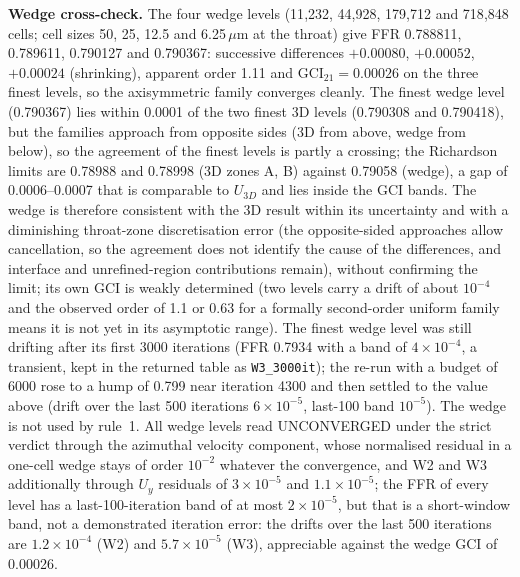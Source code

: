 \documentclass[11pt]{article}
\begin{document}
\textbf{Wedge cross-check.} The four wedge levels (11{,}232, 44{,}928, 179{,}712 and 718{,}848 cells; cell sizes 50, 25, 12.5 and 6.25\,$\mu$m at the throat) give FFR 0.788811, 0.789611, 0.790127 and 0.790367: successive differences $+0.00080$, $+0.00052$, $+0.00024$ (shrinking), apparent order 1.11 and GCI$_{21}=0.00026$ on the three finest levels, so the axisymmetric family converges cleanly. The finest wedge level (0.790367) lies within 0.0001 of the two finest 3D levels (0.790308 and 0.790418), but the families approach from opposite sides (3D from above, wedge from below), so the agreement of the finest levels is partly a crossing; the Richardson limits are 0.78988 and 0.78998 (3D zones A, B) against 0.79058 (wedge), a gap of 0.0006--0.0007 that is comparable to $U_{3D}$ and lies inside the GCI bands. The wedge is therefore consistent with the 3D result within its uncertainty and with a diminishing throat-zone discretisation error (the opposite-sided approaches allow cancellation, so the agreement does not identify the cause of the differences, and interface and unrefined-region contributions remain), without confirming the limit; its own GCI is weakly determined (two levels carry a drift of about $10^{-4}$ and the observed order of 1.1 or 0.63 for a formally second-order uniform family means it is not yet in its asymptotic range). The finest wedge level was still drifting after its first 3000 iterations (FFR 0.7934 with a band of $4\times10^{-4}$, a transient, kept in the returned table as \texttt{W3\_3000it}); the re-run with a budget of 6000 rose to a hump of 0.799 near iteration 4300 and then settled to the value above (drift over the last 500 iterations $6\times10^{-5}$, last-100 band $10^{-5}$). The wedge is not used by rule~1. All wedge levels read UNCONVERGED under the strict verdict through the azimuthal velocity component, whose normalised residual in a one-cell wedge stays of order $10^{-2}$ whatever the convergence, and W2 and W3 additionally through $U_y$ residuals of $3\times10^{-5}$ and $1.1\times10^{-5}$; the FFR of every level has a last-100-iteration band of at most $2\times10^{-5}$, but that is a short-window band, not a demonstrated iteration error: the drifts over the last 500 iterations are $1.2\times10^{-4}$ (W2) and $5.7\times10^{-5}$ (W3), appreciable against the wedge GCI of 0.00026.
\end{document}
